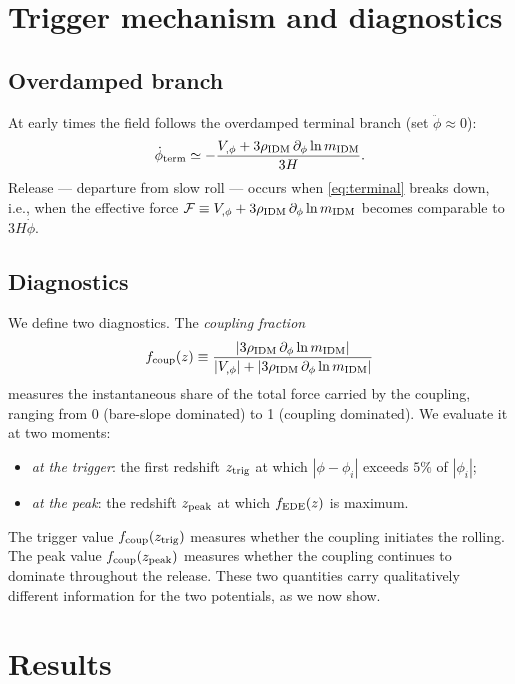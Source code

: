 \documentclass[aps,onecolumn,prd,nofootinbib,superscriptaddress,10pt,longbibliography,floatfix]{revtex4-2}
\newcommand{\fe}{f_{\rm EDE}}
\newcommand{\dlnm}{\partial_\phi \ln m_{\rm IDM}}
\newcommand{\rIDM}{\rho_{\rm IDM}}
\newcommand{\fcoup}{f_{\rm coup}}
\begin{document}
\section{Trigger mechanism and diagnostics}
\label{sec:mechanism}

\subsection{Overdamped branch}

At early times the field follows the overdamped terminal branch (set $\ddot\phi\approx 0$):
\begin{equation}
\dot\phi_{\rm term} \simeq -\frac{V_{,\phi}+3\rIDM\,\dlnm}{3H}.
\label{eq:terminal}
\end{equation}
Release — departure from slow roll — occurs when \cref{eq:terminal} breaks down, i.e., when the effective force $\mathcal{F}\equiv V_{,\phi}+3\rIDM\,\dlnm$ becomes comparable to $3H\dot\phi$.

\subsection{Diagnostics}

We define two diagnostics. The \emph{coupling fraction}
\begin{equation}
\fcoup(z) \equiv \frac{|3\rIDM\,\dlnm|}{|V_{,\phi}|+|3\rIDM\,\dlnm|}
\label{eq:fcoup}
\end{equation}
measures the instantaneous share of the total force carried by the coupling, ranging from 0 (bare-slope dominated) to 1 (coupling dominated). We evaluate it at two moments:
\begin{itemize}
\item \emph{at the trigger}: the first redshift $z_{\rm trig}$ at which $|\phi-\phi_i|$ exceeds $5\%$ of $|\phi_i|$;
\item \emph{at the peak}: the redshift $z_{\rm peak}$ at which $\fe(z)$ is maximum.
\end{itemize}
The trigger value $\fcoup(z_{\rm trig})$ measures whether the coupling initiates the rolling. The peak value $\fcoup(z_{\rm peak})$ measures whether the coupling continues to dominate throughout the release. These two quantities carry qualitatively different information for the two potentials, as we now show.

\section{Results}
\label{sec:results}
\end{document}
